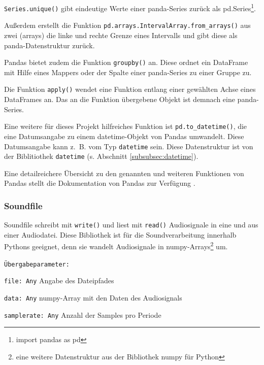 \lstinline{Series.unique()} gibt eindeutige Werte einer panda-Series zurück als pd.Series\footnote{import pandas as pd}.

Außerdem erstellt die Funktion \lstinline{pd.arrays.IntervalArray.from_arrays()} aus zwei \myPython(arrays) die linke und rechte Grenze eines Intervalls und gibt diese als panda-Daten\-struk\-tur  zurück.

Pandas bietet zudem die Funktion \texttt{groupby()} an. Diese ordnet ein DataFrame mit Hilfe eines Mappers oder der Spalte einer panda-Series zu einer Gruppe zu.

Die Funktion \texttt{apply()} wendet eine Funktion entlang einer gewählten Achse eines DataFrames an. Das an die Funktion übergebene Objekt ist demnach eine panda-Series. 

Eine weitere für dieses Projekt hilfreiches Funktion ist \texttt{pd.to\_datetime()}, die eine Datumsangabe zu einem datetime-Objekt von Pandas umwandelt. Diese Datumsangabe kann z.~B. vom Typ \texttt{datetime} sein. Diese Datenstruktur ist von der Biblitiothek \texttt{datetime} (s. Abschnitt \ref{subsubsec:datetime}).


Eine detailreichere Übersicht zu den genannten und weiteren Funktionen von Pandas stellt die Dokumentation von Pandas zur Verfügung \cite{pandas_doc}. %



\subsubsection{Soundfile}
\label{subsubsec:soundfile}

Soundfile schreibt mit \lstinline{write()} und liest mit \lstinline{read()} Audiosignale in eine und aus einer Audiodatei. Diese Bibliothek ist für die Soundverarbeitung innerhalb Pythons geeignet, denn sie wandelt Audiosignale in numpy-Arrays\footnote{eine weitere Datenstruktur aus der Bibliothek numpy für Python} um. 

 \texttt{Übergabeparameter:}
 
 \texttt{file: Any} Angabe des Dateipfades
 
\texttt{data: Any}  numpy-Array mit den Daten des Audiosignals

 \texttt{samplerate: Any} Anzahl der Samples pro Periode

